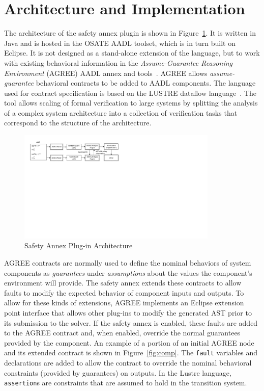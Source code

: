 \section{Architecture and Implementation}


The architecture of the safety annex plugin is shown in Figure~\ref{fig:plugin-arch}.  It is written in Java and is hosted in the OSATE AADL toolset, which is in turn built on Eclipse.  It is not designed as a stand-alone extension of the language, but to work with existing behavioral information in the {\em Assume-Guarantee Reasoning Environment} (AGREE) AADL annex and tools~\cite{NFM2012:CoGaMiWhLaLu}.  AGREE allows {\em assume-guarantee} behavioral contracts to be added to AADL components.  The language used for contract specification is based on the LUSTRE dataflow language~\cite{Halbwachs91:IEEE}. The tool allows scaling of formal verification to large systems by splitting the analysis of a complex system architecture into a collection of verification tasks that correspond to the structure of the architecture.

\begin{figure}
\begin{center}
\includegraphics[trim=0 400 430 0,clip,width=0.85\textwidth]{images/arch.png}
\end{center}
\vspace{-0.2in}
\caption{Safety Annex Plug-in Architecture}
\label{fig:plugin-arch}
\end{figure}

AGREE contracts are normally used to define the nominal behaviors of system components as {\em guarantees} under {\em assumptions} about the values the component's environment will provide.  The safety annex extends these contracts to allow faults to modify the expected behavior of component inputs and outputs.  To allow for these kinds of extensions, AGREE implements an Eclipse extension point interface that allows other plug-ins to modify the generated AST prior to its submission to the solver.  If the safety annex is enabled, these faults are added to the AGREE contract and, when enabled, override the normal guarantees provided by the component.  An example of a portion of an initial AGREE node and its extended contract is shown in Figure~\ref{fig:comp}.  The \texttt{fault} variables and declarations are added to allow the contract to override the nominal behavioral constraints (provided by guarantees) on outputs.  In the Lustre language, \texttt{assertion}s are constraints that are assumed to hold in the transition system.

